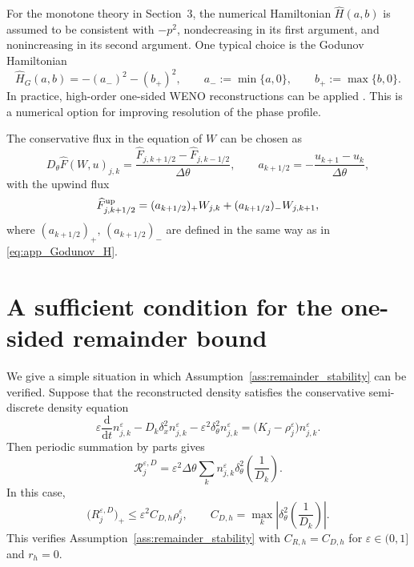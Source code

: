 \documentclass[11pt]{article}
\begin{document}
For the monotone theory in Section~3, the numerical Hamiltonian
\(\widehat H(a,b)\) is assumed to be consistent with \(-p^2\), nondecreasing in
its first argument, and nonincreasing in its second argument.  One typical 
choice is the Godunov Hamiltonian
\begin{equation}
\label{eq:app_Godunov_H}
    \widehat H_G(a,b)
    =
    -(a_-)^2-(b_+)^2,
    \qquad
    a_-:=\min\{a,0\},
    \qquad
    b_+:=\max\{b,0\}.
\end{equation}
In practice, high-order one-sided WENO reconstructions can be applied \cite{JiangPeng, OsherShu, ShuHJ}.  
This is a numerical option for
improving resolution of the phase profile.  

The conservative flux in the equation of $W$ can be chosen as 
\[
    D_\theta\widehat F(W,u)_{j,k}
    =
    \frac{\widehat F_{j,k+1/2}-\widehat F_{j,k-1/2}}{\Delta\theta},
    \qquad
    a_{k+1/2}
    =
    -\frac{u_{k+1}-u_k}{\Delta\theta},
\]
with the upwind flux 
\begin{equation}
\label{eq:app_upwind_flux}
    \widehat F^{\rm up}_{j,k+1/2}
    =
    (a_{k+1/2})_+ W_{j,k}
    +
    (a_{k+1/2})_- W_{j,k+1}, 
\end{equation}
where $(a_{k+1/2})_+, \, (a_{k+1/2})_-$ are defined in the same way as in \eqref{eq:app_Godunov_H}.


\section{A sufficient condition for the one-sided remainder bound}
\label{app:remainder}

We give a simple situation in which Assumption~\ref{ass:remainder_stability} can be
verified.  Suppose that the reconstructed density satisfies the conservative
semi-discrete density equation
\begin{equation}
\label{eq:app_density_compatible_n}
    \varepsilon\frac{\mathrm d}{\mathrm dt}n_{j,k}^\varepsilon
    -
    D_k\delta_x^2 n_{j,k}^\varepsilon
    -
    \varepsilon^2\delta_\theta^2 n_{j,k}^\varepsilon
    =
    \bigl(K_j-\rho_{j}^\varepsilon\bigr)n_{j,k}^\varepsilon .
\end{equation}
Then periodic summation by parts gives
\[
    \mathcal R_j^{\varepsilon,D}
    =
    \varepsilon^2\Delta\theta
    \sum_k
    n_{j,k}^\varepsilon
    \delta_\theta^2\left(\frac{1}{D_k}\right).
\]
In this case, 
\[
    \bigl(R_j^{\varepsilon,D}\bigr)_+
    \le
    \varepsilon^2 C_{D,h}\rho_j^\varepsilon,
    \qquad
    C_{D,h}
    =
    \max_k
    \left|
    \delta_\theta^2\left(\frac{1}{D_k}\right)
    \right|.
\]
This verifies Assumption~\ref{ass:remainder_stability} with \(C_{R,h}=C_{D,h}\) for $\varepsilon\in(0,1]$ and
\(r_h=0\). 
\end{document}
